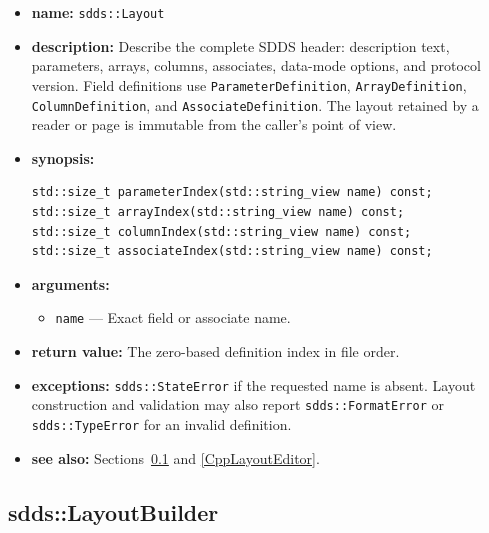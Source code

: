 \documentclass[11pt]{article}
\begin{document}
\begin{itemize}
\item {\bf name:}\newline
{\tt sdds::Layout}
\item {\bf description:}\newline
Describe the complete SDDS header: description text, parameters, arrays,
columns, associates, data-mode options, and protocol version.  Field
definitions use {\tt ParameterDefinition}, {\tt ArrayDefinition},
{\tt ColumnDefinition}, and {\tt AssociateDefinition}.  The layout retained by
a reader or page is immutable from the caller's point of view.
\item {\bf synopsis:}
\begin{verbatim}
std::size_t parameterIndex(std::string_view name) const;
std::size_t arrayIndex(std::string_view name) const;
std::size_t columnIndex(std::string_view name) const;
std::size_t associateIndex(std::string_view name) const;
\end{verbatim}
\item {\bf arguments:}
\begin{itemize}
\item {\tt name} --- Exact field or associate name.
\end{itemize}
\item {\bf return value:}\newline
The zero-based definition index in file order.
\item {\bf exceptions:}\newline
{\tt sdds::StateError} if the requested name is absent.  Layout construction
and validation may also report {\tt sdds::FormatError} or
{\tt sdds::TypeError} for an invalid definition.
\item {\bf see also:}\newline
Sections~\ref{CppLayoutBuilder} and \ref{CppLayoutEditor}.
\end{itemize}

\subsection{sdds::LayoutBuilder}
\label{CppLayoutBuilder}
\end{document}
